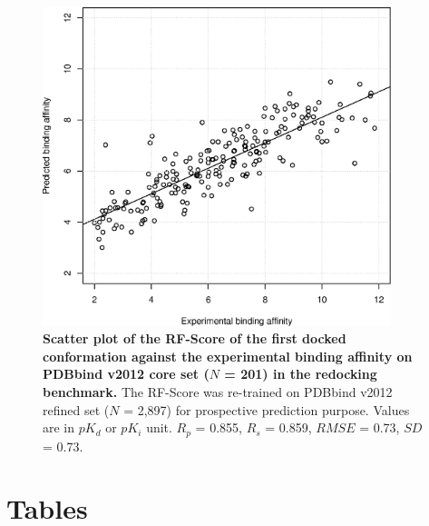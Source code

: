 \documentclass[10pt]{article}
\begin{document}
\begin{figure}[!ht]
\begin{center}
\includegraphics[width=4in]{../istar/pK-idockConf1RFScore.eps}
\end{center}
\caption{
{\bf Scatter plot of the RF-Score of the first docked conformation against the experimental binding affinity on PDBbind v2012 core set ($N$ = 201) in the redocking benchmark.} The RF-Score was re-trained on PDBbind v2012 refined set ($N$ = 2,897) for prospective prediction purpose. Values are in $pK_d$ or $pK_i$ unit. $R_p$ = 0.855, $R_s$ = 0.859, $RMSE$ = 0.73, $SD$ = 0.73.
}
\label{pK-idockConf1RFScore}
\end{figure}

\section*{Tables}
\end{document}
